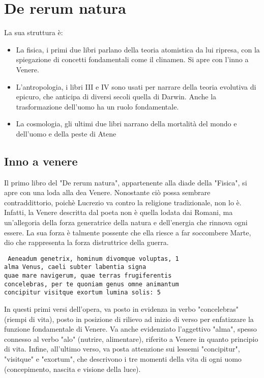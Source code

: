 \documentclass[10pt,a4paper]{article}
\begin{document}
	\section{De rerum natura}
	
	La sua struttura è:
	
	\begin{itemize}
		\item La fisica, i primi due libri parlano della teoria atomistica da lui ripresa, con la spiegazione di concetti fondamentali come il clinamen. Si apre con l'inno a Venere.
		\item L'antropologia, i libri III e IV sono usati per narrare della teoria evolutiva di epicuro, che anticipa di diversi secoli quella di Darwin. Anche la trasformazione dell'uomo ha un ruolo fondamentale. 
		\item La cosmologia, gli ultimi due libri narrano della mortalità del mondo e dell'uomo e della peste di Atene
	\end{itemize}

	\subsection{Inno a venere}
	
	Il primo libro del "De rerum natura", appartenente alla diade della "Fisica", si apre con una loda alla dea Venere. Nonostante ciò possa sembrare contraddittorio, poichè Lucrezio va contro la religione tradizionale, non lo è. Infatti, la Venere descritta dal poeta non è quella lodata dai Romani, ma un'allegoria della forza generatrice della natura e dell'energia che rinnova ogni essere. La sua forza è talmente possente che ella riesce a far soccombere Marte, dio che rappresenta la forza distruttrice della guerra. 
	
		\begin{estratto}
\texttt{	Aeneadum genetrix, hominum divomque voluptas, 1\\
			alma Venus, caeli subter labentia signa \\
			quae mare navigerum, quae terras frugiferentis \\
			concelebras, per te quoniam genus omne animantum \\
			concipitur visitque exortum lumina solis: 5}
		\end{estratto}
	
	In questi primi versi dell'opera, va posto in evidenza in verbo "concelebras" (riempi di vita), posto in posizione di rilievo ad inizio di verso per enfatizzare la funzione fondamentale di Venere. Va anche evidenziato l'aggettivo "alma", spesso connesso al verbo "alo" (nutrire, alimentare), riferito a Venere in quanto principio di vita. Infine, all'ultimo verso, va posta attenzione sui lessemi "concipitur", "visitque" e "exortum", che descrivono i tre momenti della vita di ogni uomo (concepimento, nascita e visione della luce).
	
\end{document}

